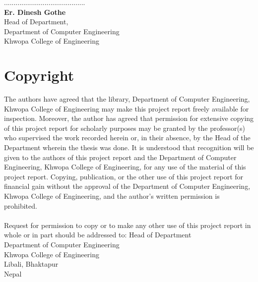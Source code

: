             \vspace{0.5in}
            \begin{center}
            	..........................................\\
            	\textbf{Er. Dinesh Gothe}\\
            	Head of Department,\\
            	Department of Computer Engineering\\
            	Khwopa College of Engineering
            \end{center}
            \pagebreak
            \endgroup
		\large
			\chapter*{Copyright}
		\normalsize
		
		The authors have agreed that the library, Department of Computer Engineering, Khwopa College of Engineering may make this project report freely available
for inspection. Moreover, the author has agreed that permission for extensive copying of
this project report for scholarly purposes may be granted by the professor(s) who
supervised the work recorded herein or, in their absence, by the Head of the Department
wherein the thesis was done. It is understood that recognition will be given to the
authors of this project report and the Department of Computer Engineering, Khwopa College of Engineering, for any use of the material of this project
report. Copying, publication, or the other use of this project report for financial gain
without the approval of the Department of Computer Engineering, Khwopa College of Engineering, and the author's written permission is prohibited.\\ \\
Request for permission to copy or to make any other use of this project report in whole or in part should be addressed to:
\newline
\newline
\newline
\newline
Head of Department\\
Department of Computer Engineering\\
Khwopa College of Engineering\\
Libali, Bhaktapur \\
Nepal
		\break

	\newpage
		 \large
